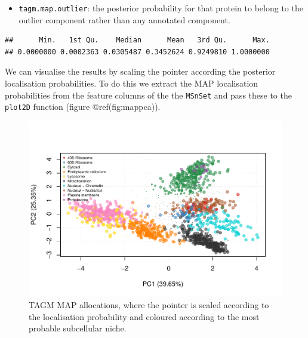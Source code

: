 \documentclass[
]{article}
\newenvironment{Shaded}{\begin{snugshade}}{\end{snugshade}}
\newcommand{\CommentTok}[1]{\textcolor[rgb]{0.56,0.35,0.01}{\textit{#1}}}
\newcommand{\DataTypeTok}[1]{\textcolor[rgb]{0.13,0.29,0.53}{#1}}
\newcommand{\FloatTok}[1]{\textcolor[rgb]{0.00,0.00,0.81}{#1}}
\newcommand{\KeywordTok}[1]{\textcolor[rgb]{0.13,0.29,0.53}{\textbf{#1}}}
\newcommand{\NormalTok}[1]{#1}
\newcommand{\OperatorTok}[1]{\textcolor[rgb]{0.81,0.36,0.00}{\textbf{#1}}}
\newcommand{\StringTok}[1]{\textcolor[rgb]{0.31,0.60,0.02}{#1}}
\providecommand{\tightlist}{%
  \setlength{\itemsep}{0pt}\setlength{\parskip}{0pt}}
\begin{document}
\begin{itemize}
\tightlist
\item
  \texttt{tagm.map.outlier}: the posterior probability for that protein
  to belong to the outlier component rather than any annotated
  component.
\end{itemize}

\begin{Shaded}
\end{Shaded}

\begin{verbatim}
##      Min.   1st Qu.    Median      Mean   3rd Qu.      Max. 
## 0.0000000 0.0002363 0.0305487 0.3452624 0.9249810 1.0000000
\end{verbatim}

We can visualise the results by scaling the pointer according the
posterior localisation probabilities. To do this we extract the MAP
localisation probabilities from the feature columns of the the
\texttt{MSnSet} and pass these to the \texttt{plot2D} function (figure
@ref(fig:mappca)).

\begin{Shaded}
\end{Shaded}

\begin{figure}
\includegraphics[width=0.7\linewidth]{F1000TAGMworkflow_rev1_files/figure-latex/mappca-1} \caption{TAGM MAP allocations, where the pointer is scaled according to the localisation probability and coloured according to the most probable subcellular niche.}\label{fig:mappca}
\end{figure}
\end{document}
